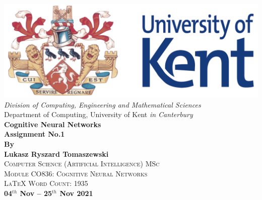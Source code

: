 \begin{titlepage}
\newcommand{\HRule}{\rule{\linewidth}{0.5mm}}
\begin{centering} 
\includegraphics[scale=0.4]{Media/Script/Head.png} \\
\vspace{0.5cm} 
\large{\emph{Division of Computing, Engineering and Mathematical Sciences}} \\ [0.1cm]
\large{{Department of Computing, University of Kent \emph{in Canterbury}}} \\ [1.5cm]
\Huge{\bfseries{Cognitive Neural Networks \\ Assignment No.1}} \\ [1.5cm]
{\Large \bfseries{By \\ [0.2cm] Lukasz Ryszard Tomaszewski}}\\[0.5cm]
\textsc{\Large Computer Science (Artificial Intelligence) MSc}\\ [-0.2cm]
\textsc{\large Module CO836: Cognitive Neural Networks}\\ [0.5cm]
\textsc{\large LaTeX Word Count: 1935}\\ [1cm]
\textbf{\Large{04$^{th}$ Nov -- 25$^{th}$ Nov 2021}}\\
\end{centering} 
\end{titlepage}
\newpage
\begin{titlepage}
\begin{tableofcontents}
\end{tableofcontents}
\end{titlepage}
\newpage